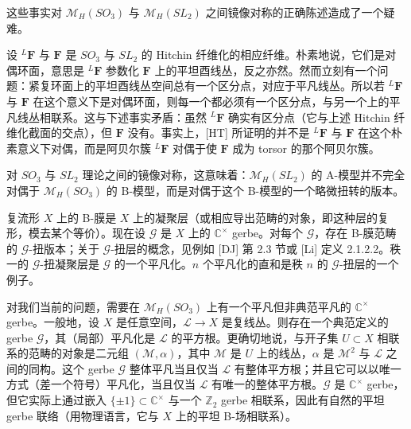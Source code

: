 \documentclass[11pt,a4paper]{article}
\begin{document}
这些事实对 $\mathcal{M}_H(SO_3)$ 与 $\mathcal{M}_H(SL_2)$ 之间镜像对称的正确陈述造成了一个疑难。

设 ${}^{L}\boldsymbol{F}$ 与 $\boldsymbol{F}$ 是 $SO_3$ 与 $SL_2$ 的 Hitchin 纤维化的相应纤维。朴素地说，它们是对偶环面，意思是 ${}^{L}\boldsymbol{F}$ 参数化 $\boldsymbol{F}$ 上的平坦酉线丛，反之亦然。然而立刻有一个问题：紧复环面上的平坦酉线丛空间总有一个区分点，对应于平凡线丛。所以若 ${}^{L}\boldsymbol{F}$ 与 $\boldsymbol{F}$ 在这个意义下是对偶环面，则每一个都必须有一个区分点，与另一个上的平凡线丛相联系。这与下述事实矛盾：虽然 ${}^{L}\boldsymbol{F}$ 确实有区分点（它与上述 Hitchin 纤维化截面的交点），但 $\boldsymbol{F}$ 没有。事实上，[HT] 所证明的并不是 ${}^{L}\boldsymbol{F}$ 与 $\boldsymbol{F}$ 在这个朴素意义下对偶，而是阿贝尔簇 ${}^{L}\boldsymbol{F}$ 对偶于使 $\boldsymbol{F}$ 成为 torsor 的那个阿贝尔簇。


对 $SO_3$ 与 $SL_2$ 理论之间的镜像对称，这意味着：$\mathcal{M}_H(SL_2)$ 的 A-模型并不完全对偶于 $\mathcal{M}_H(SO_3)$ 的 B-模型，而是对偶于这个 B-模型的一个略微扭转的版本。

复流形 $X$ 上的 B-膜是 $X$ 上的凝聚层（或相应导出范畴的对象，即这种层的复形，模去某个等价）。现在设 $\mathcal{G}$ 是 $X$ 上的 $\mathbb{C}^\times$ gerbe。对每个 $\mathcal{G}$，存在 B-膜范畴的 $\mathcal{G}$-扭版本；关于 $\mathcal{G}$-扭层的概念，见例如 [DJ] 第 2.3 节或 [Li] 定义 2.1.2.2。秩一的 $\mathcal{G}$-扭凝聚层是 $\mathcal{G}$ 的一个平凡化。$n$ 个平凡化的直和是秩 $n$ 的 $\mathcal{G}$-扭层的一个例子。

对我们当前的问题，需要在 $\mathcal{M}_H(SO_3)$ 上有一个平凡但非典范平凡的 $\mathbb{C}^\times$ gerbe。一般地，设 $X$ 是任意空间，$\mathcal{L}\to X$ 是复线丛。则存在一个典范定义的 gerbe $\mathcal{G}$，其（局部）平凡化是 $\mathcal{L}$ 的平方根。更确切地说，与开子集 $U\subset X$ 相联系的范畴的对象是二元组 $(\mathcal{M},\alpha)$，其中 $\mathcal{M}$ 是 $U$ 上的线丛，$\alpha$ 是 $\mathcal{M}^2$ 与 $\mathcal{L}$ 之间的同构。这个 gerbe $\mathcal{G}$ 整体平凡当且仅当 $\mathcal{L}$ 有整体平方根；并且它可以以唯一方式（差一个符号）平凡化，当且仅当 $\mathcal{L}$ 有唯一的整体平方根。$\mathcal{G}$ 是 $\mathbb{C}^\times$ gerbe，但它实际上通过嵌入 $\{\pm1\}\subset\mathbb{C}^\times$ 与一个 $\mathbb{Z}_2$ gerbe 相联系，因此有自然的平坦 gerbe 联络（用物理语言，它与 $X$ 上的平坦 B-场相联系）。
\end{document}
